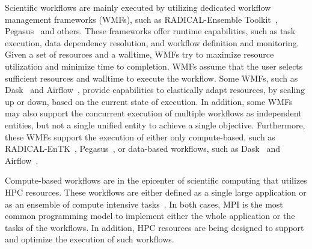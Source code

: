 Scientific workflows are mainly executed by utilizing dedicated workflow management frameworks (WMFs), such as RADICAL-Ensemble Toolkit~\cite{balasubramanian2018harnessing}, Pegasus~\cite{deelman2015pegasus} and others.
These frameworks offer runtime capabilities, such as task execution, data dependency resolution, and workflow definition and monitoring.
Given a set of resources and a walltime, WMFs try to maximize resource utilization and minimize time to completion.
WMFs assume that the user selects sufficient resources and walltime to execute the workflow.
Some WMFs, such as Dask~\cite{rocklin2015dask} and Airflow~\cite{airflow}, provide capabilities to elastically adapt resources, by scaling up or down, based on the current state of execution.
In addition, some  WMFs~\cite{deelman2015pegasus} may also support the concurrent execution of multiple workflows as independent entities, but not a single unified entity to achieve a single objective.
Furthermore, these WMFs support the execution of either only compute-based, such as RADICAL-EnTK~\cite{balasubramanian2018harnessing}, Pegasus~\cite{deelman2015pegasus}, or data-based workflows, such as Dask~\cite{rocklin2015dask} and Airflow~\cite{airflow}.

Compute-based workflows are in the epicenter of scientific computing that utilizes HPC resources.
These workflows are either defined as a single large application or as an ensemble of compute intensive tasks~\cite{balasubramanian2018harnessing}.
In both cases, MPI is the most common programming model to implement either the whole application or the tasks of the workflows.
In addition, HPC resources are being designed to support and optimize the execution of such workflows.




